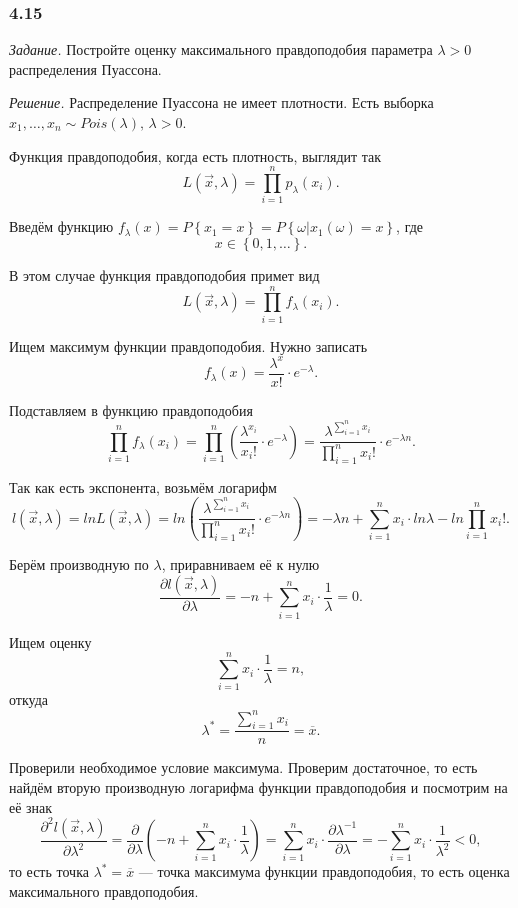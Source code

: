 \subsubsection*{4.15}

\textit{Задание.}
Постройте оценку максимального правдоподобия параметра $ \lambda > 0$ распределения Пуассона.

\textit{Решение.} Распределение Пуассона не имеет плотности.
Есть выборка $x_1, \dotsc, x_n \sim Pois \left( \lambda \right), \, \lambda > 0$.

Функция правдоподобия, когда есть плотность, выглядит так
$$L \left( \vec{x}, \lambda \right) =
  \prod \limits_{i = 1}^n p_{ \lambda } \left( x_i \right).$$

Введём функцию
$f_{ \lambda } \left( x \right) =
  P \left\{ x_1 = x \right\} =
  P \left\{ \left. \omega \right| x_1 \left( \omega \right) = x \right\} $,
где
$$x \in
  \left\{ 0, 1, \dotsc \right\}.$$

В этом случае функция правдоподобия примет вид
$$L \left( \vec{x}, \lambda \right) =
  \prod \limits_{i = 1}^n f_{ \lambda } \left( x_i \right).$$

Ищем максимум функции правдоподобия.
Нужно записать
$$f_{ \lambda } \left( x \right) =
  \frac{ \lambda^x}{x!} \cdot e^{- \lambda }.$$

Подставляем в функцию правдоподобия
$$ \prod \limits_{i = 1}^n f_{ \lambda } \left( x_i \right) =
  \prod \limits_{i = 1}^n \left( \frac{ \lambda^{x_i}}{x_i!} \cdot e^{- \lambda } \right) =
  \frac{ \lambda^{ \sum \limits_{i = 1}^n x_i}}{ \prod \limits_{i = 1}^n x_i!} \cdot
  e^{- \lambda n}.$$

Так как есть экспонента, возьмём логарифм
$$l \left( \vec{x}, \lambda \right) =
  ln L \left( \vec{x}, \lambda \right) =
  ln \left(
    \frac{ \lambda^{ \sum \limits_{i = 1}^n x_i}}{ \prod \limits_{i = 1}^n x_i!} \cdot
    e^{- \lambda n}
  \right) =
  - \lambda n + \sum \limits_{i = 1}^n x_i \cdot ln \lambda - ln \prod \limits_{i = 1}^n x_i!.$$

Берём производную по $ \lambda $, приравниваем её к нулю
$$ \frac{ \partial l \left( \vec{x}, \lambda \right) }{ \partial \lambda } =
  -n + \sum \limits_{i = 1}^n x_i \cdot \frac{1}{ \lambda } =
  0.$$

Ищем оценку
$$ \sum \limits_{i = 1}^n x_i \cdot \frac{1}{ \lambda } =
  n,$$
откуда
$$ \lambda^* =
  \frac{ \sum \limits_{i = 1}^n x_i}{n} =
  \overline{x}.$$

Проверили необходимое условие максимума.
Проверим достаточное,
то есть найдём вторую производную логарифма функции правдоподобия и посмотрим на её знак
$$ \frac{ \partial^2 l \left( \vec{x}, \lambda \right) }{ \partial \lambda^2} =
  \frac{ \partial }{ \partial \lambda } \left(
    -n + \sum \limits_{i = 1}^n x_i \cdot \frac{1}{ \lambda }
  \right) =
  \sum \limits_{i = 1}^n x_i \cdot \frac{ \partial \lambda^{-1}}{ \partial \lambda } =
  - \sum \limits_{i = 1}^n x_i \cdot \frac{1}{ \lambda^2} <
  0,$$
то есть точка $ \lambda^* = \overline{x}$ --- точка максимума функции правдоподобия,
то есть оценка максимального правдоподобия.

